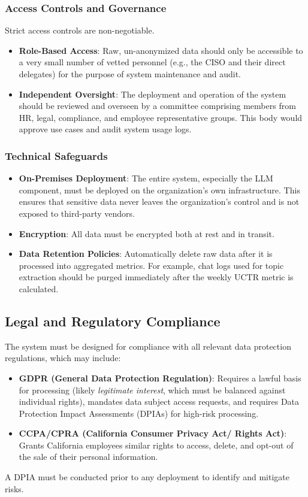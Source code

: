 \documentclass[11pt, a4paper]{article}
\begin{document}
\subsubsection{Access Controls and Governance}
Strict access controls are non-negotiable.
\begin{itemize}
    \item \textbf{Role-Based Access}: Raw, un-anonymized data should only be accessible to a very small number of vetted personnel (e.g., the CISO and their direct delegates) for the purpose of system maintenance and audit.
    \item \textbf{Independent Oversight}: The deployment and operation of the system should be reviewed and overseen by a committee comprising members from HR, legal, compliance, and employee representative groups. This body would approve use cases and audit system usage logs.
\end{itemize}

\subsubsection{Technical Safeguards}
\begin{itemize}
    \item \textbf{On-Premises Deployment}: The entire system, especially the LLM component, must be deployed on the organization's own infrastructure. This ensures that sensitive data never leaves the organization's control and is not exposed to third-party vendors.
    \item \textbf{Encryption}: All data must be encrypted both at rest and in transit.
    \item \textbf{Data Retention Policies}: Automatically delete raw data after it is processed into aggregated metrics. For example, chat logs used for topic extraction should be purged immediately after the weekly UCTR metric is calculated.
\end{itemize}

\subsection{Legal and Regulatory Compliance}
The system must be designed for compliance with all relevant data protection regulations, which may include:
\begin{itemize}
    \item \textbf{GDPR (General Data Protection Regulation)}: Requires a lawful basis for processing (likely \textit{legitimate interest}, which must be balanced against individual rights), mandates data subject access requests, and requires Data Protection Impact Assessments (DPIAs) for high-risk processing.
    \item \textbf{CCPA/CPRA (California Consumer Privacy Act/ Rights Act)}: Grants California employees similar rights to access, delete, and opt-out of the sale of their personal information.
\end{itemize}
A DPIA must be conducted prior to any deployment to identify and mitigate risks.
\end{document}
